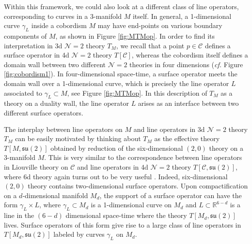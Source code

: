 \documentclass[hyper,letterpaper]{JHEP3}
\numberwithin{equation}{section}
\newcommand{\R}{{\mathbb R}}
\newcommand{\CC}{\mathcal{C}}
\newcommand{\CN}{\mathcal{N}}
\begin{document}
Within this framework, we could also look at a different class of line operators, corresponding to curves in a 3-manifold $M$ itself.
In general, a 1-dimensional curve $\gamma_L$ inside a cobordism $M$ may have end-points
on various boundary components of $M$, as shown in Figure \ref{fig:MTMop}.
In order to find its interpretation in 3d $\CN=2$ theory $T_M$, we recall that
a point $p \in \CC$ defines a surface operator in 4d $\CN=2$ theory $T[\CC]$,
whereas the cobordism itself defines a domain wall between two different $\CN=2$ theories
in four dimensions ({\it cf.} Figure \ref{fig:cobordism1}).
In four-dimensional space-time, a surface operator meets the domain wall over
a 1-dimensional curve, which is precisely the line operator $L$ associated to $\gamma_L \subset M$, see Figure \ref{fig:MTMop}.
In this description of $T_M$ as a theory on a duality wall,
the line operator $L$ arises as an interface between two different surface operators.

The interplay between line operators on $M$ and line operators in 3d $\CN=2$ theory $T_M$ can be
easily motivated by thinking about $T_M$ as the effective theory
$T[M,\mathfrak{su}(2)]$ obtained by reduction of the six-dimensional $(2,0)$ theory on a 3-manifold $M$.
This is very similar to the correspondence between line operators in Liouville theory on $\CC$
and line operators in 4d $\CN=2$ theory $T[\CC,\mathfrak{su}(2)]$,
where 6d theory again turns out to be very useful \cite{DMO,AGGTV,DGOT}.
Indeed, six-dimensional $(2,0)$ theory contains two-dimensional surface operators.
Upon compactification on a $d$-dimensional manifold $M_d$, the support of a surface operator
can have the form $\gamma_L \times L$, where $\gamma_L \subset M_d$ is a 1-dimensional curve on $M_d$
and $L \subset \R^{6-d}$ is a line in the $(6-d)$ dimensional space-time where the theory $T[M_d,\mathfrak{su}(2)]$ lives.
Surface operators of this form give rise to a large class of line operators in $T[M_d,\mathfrak{su}(2)]$
labeled by curves $\gamma_L$ on $M_d$.












\end{document}
